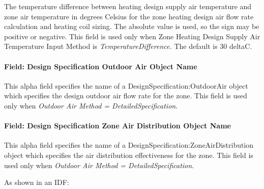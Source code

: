 The temperature difference between heating design supply air temperature and zone air temperature in degrees Celsius for the zone heating design air flow rate calculation and heating coil sizing. The absolute value is used, so the sign may be positive or negative. This field is used only when Zone Heating Design Supply Air Temperature Input Method is \emph{TemperatureDifference.} The default is 30 deltaC.

\paragraph{Field: Design Specification Outdoor Air Object Name}\label{field-design-specification-outdoor-air-object-name-7}

This alpha field specifies the name of a DesignSpecification:OutdoorAir object which specifies the design outdoor air flow rate for the zone. This field is used only when \emph{Outdoor Air Method = DetailedSpecification}.

\paragraph{Field: Design Specification Zone Air Distribution Object Name}\label{field-design-specification-zone-air-distribution-object-name-6}

This alpha field specifies the name of a DesignSpecification:ZoneAirDistribution object which specifies the air distribution effectiveness for the zone. This field is used only when \emph{Outdoor Air Method = DetailedSpecification}.

As shown in an IDF:

